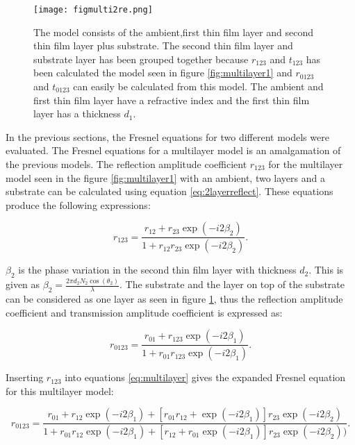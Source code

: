 \documentclass[MasterThesisMain.tex]{subfiles}
\begin{document}
\begin{figure}
\centering
\texttt{[image: figmulti2re.png]}
\caption{The model consists of the ambient,first thin film layer and second thin film layer plus substrate. The second thin film layer and substrate layer has been grouped together because $r_{123}$ and $t_{123}$ has been calculated the model seen in figure \ref{fig:multilayer1} and $r_{0123}$ and $t_{0123}$ can easily be calculated from this model. The ambient and first thin film layer have a refractive index and the first thin film layer has a thickness $d_1$.}
\label{fig:multilayer2}
\end{figure}


In the previous sections, the Fresnel equations for two different models were evaluated. The Fresnel equations for a multilayer model is an amalgamation of the previous models. The reflection amplitude coefficient $r_{123}$ for the multilayer model seen in the figure \ref{fig:multilayer1} with an ambient, two layers and a substrate can be calculated using equation \ref{eq:2layerreflect}. These equations produce the following expressions:

\begin{equation}
r_{123}= \frac{r_{12}+r_{23}\exp(-i2\beta_2)}{1+r_{12}r_{23}\exp(-i2\beta_2)}.
\end{equation}

$\beta_2$ is the phase variation in the second thin film layer with thickness $d_2$. This is given as $\beta_2=\frac{2\pi d_2N_2\cos(\theta_2)}{\lambda}$. The substrate and the layer on top of the substrate can be considered as one layer as seen in figure \ref{fig:multilayer2}, thus the reflection amplitude coefficient and transmission amplitude coefficient is expressed as:         

\begin{equation}\label{eq:multilayer}
r_{0123}= \frac{r_{01}+r_{123}\exp(-i2\beta_1)}{1+r_{01}r_{123}\exp(-i2\beta_1)}.
\end{equation}

Inserting $r_{123}$ into equations \ref{eq:multilayer} gives the expanded Fresnel equation for this multilayer model:

\begin{equation}
r_{0123} = \frac{r_{01}+r_{12}\exp(-i2\beta_1)+[r_{01}r_{12}+\exp(-i2\beta_1)]r_{23}\exp(-i2\beta_2)}{1+r_{01}r_{12}\exp(-i2\beta_1)+[r_{12}+r_{01}\exp(-i2\beta_1)]r_{23}\exp(-i2\beta_2))}.
\end{equation}
\end{document}

